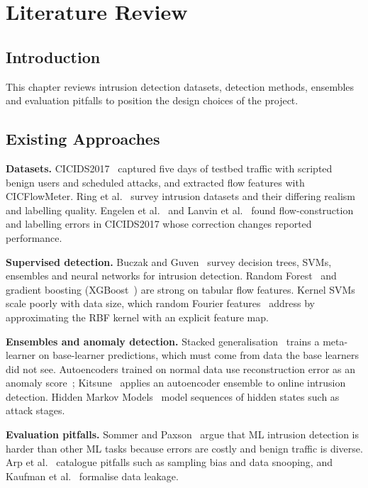 \documentclass[12pt,a4paper,oneside]{report}
\begin{document}
\chapter{Literature Review}

\section{Introduction}
This chapter reviews intrusion detection datasets, detection methods, ensembles and evaluation pitfalls to position the design choices of the project.

\section{Existing Approaches}
\textbf{Datasets.} CICIDS2017~\cite{sharafaldin2018toward} captured five days of testbed traffic with scripted benign users and scheduled attacks, and extracted flow features with CICFlowMeter. Ring et al.~\cite{ring2019survey} survey intrusion datasets and their differing realism and labelling quality. Engelen et al.~\cite{engelen2021troubleshooting} and Lanvin et al.~\cite{lanvin2022errors} found flow-construction and labelling errors in CICIDS2017 whose correction changes reported performance.

\textbf{Supervised detection.} Buczak and Guven~\cite{buczak2016survey} survey decision trees, SVMs, ensembles and neural networks for intrusion detection. Random Forest~\cite{breiman2001random} and gradient boosting (XGBoost~\cite{chen2016xgboost}) are strong on tabular flow features. Kernel SVMs~\cite{cortes1995support} scale poorly with data size, which random Fourier features~\cite{rahimi2007random} address by approximating the RBF kernel with an explicit feature map.

\textbf{Ensembles and anomaly detection.} Stacked generalisation~\cite{wolpert1992stacked} trains a meta-learner on base-learner predictions, which must come from data the base learners did not see. Autoencoders trained on normal data use reconstruction error as an anomaly score~\cite{sakurada2014anomaly}; Kitsune~\cite{mirsky2018kitsune} applies an autoencoder ensemble to online intrusion detection. Hidden Markov Models~\cite{rabiner1989tutorial} model sequences of hidden states such as attack stages.

\textbf{Evaluation pitfalls.} Sommer and Paxson~\cite{sommer2010outside} argue that ML intrusion detection is harder than other ML tasks because errors are costly and benign traffic is diverse. Arp et al.~\cite{arp2022dos} catalogue pitfalls such as sampling bias and data snooping, and Kaufman et al.~\cite{kaufman2012leakage} formalise data leakage.
\end{document}
